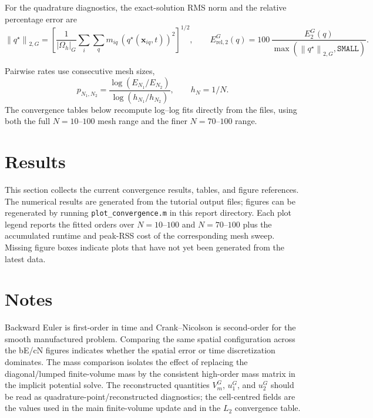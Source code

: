 \documentclass[11pt,a4paper]{article}
\newcommand{\code}[1]{\texttt{\small #1}}
\newcommand{\norm}[1]{\left\lVert #1 \right\rVert}
\begin{document}
For the quadrature diagnostics, the exact-solution RMS norm and the relative
percentage error are
\begin{equation}
  \norm{q^\star}_{2,G}
  =
  \left[
  \frac{1}{|\Omega_h|_G}
  \sum_i\sum_q m_{iq}\,
  \left(q^\star(\mathbf{x}_{iq},t)\right)^2
  \right]^{1/2},
  \qquad
  E_{\mathrm{rel},2}^{G}(q)
  =
  100\,\frac{E_2^G(q)}{\max(\norm{q^\star}_{2,G},\texttt{SMALL})}.
\end{equation}

Pairwise rates use consecutive mesh sizes,
\begin{equation}
p_{N_1,N_2} = \frac{\log(E_{N_1}/E_{N_2})}{\log(h_{N_1}/h_{N_2})}, \qquad h_N=1/N.
\end{equation}
The convergence tables below recompute log--log fits directly from the  files, using both the full $N=10$--$100$ mesh range and the finer $N=70$--$100$ range.


\section{Results}

This section collects the current convergence results, tables, and figure
references. The numerical results are generated from the tutorial output files;
figures can be regenerated by running \code{plot\_convergence.m} in this report
directory. Each plot legend reports the fitted orders over $N=10$--$100$ and
$N=70$--$100$ plus the accumulated runtime and peak-RSS cost of the
corresponding mesh sweep. Missing figure boxes indicate plots that have not yet
been generated from the latest data.




\section{Notes}
Backward Euler is first-order in time and Crank--Nicolson is second-order for the smooth manufactured problem. Comparing the same spatial configuration across the bE/cN figures indicates whether the spatial error or time discretization dominates. The mass comparison isolates the effect of replacing the diagonal/lumped finite-volume mass by the consistent high-order mass matrix in the implicit potential solve. The reconstructed quantities $V_m^G$, $u_1^G$, and $u_2^G$ should be read as quadrature-point/reconstructed diagnostics; the cell-centred fields are the values used in the main finite-volume update and in the $L_2$ convergence table.
\end{document}
